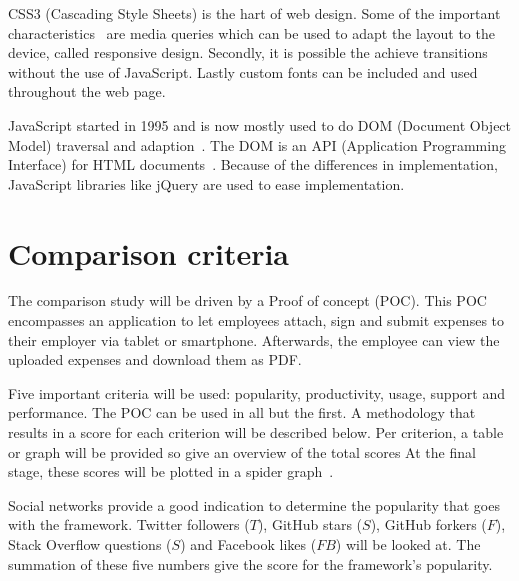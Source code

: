 \documentclass[a4paper]{artikel3}
\newcommand{\setspace}[0]{\vspace{2mm}}
\renewcommand{\paragraph}[1]{\setspace \noindent {\bf #1}  }
\begin{document}
CSS3 (Cascading Style Sheets) is the hart of web design.
Some of the important characteristics~\cite{MacDonald2011} are media queries which can be used to adapt the layout to the device, called responsive design.
Secondly, it is possible the achieve transitions without the use of JavaScript.
Lastly custom fonts can be included and used throughout the web page.

JavaScript started in 1995 and is now mostly used to do DOM (Document Object Model) traversal and adaption~\cite{PhilDutson2012}.
The DOM is an API (Application Programming Interface) for HTML documents~\cite{Hegaret2004}.
Because of the differences in implementation, JavaScript libraries like jQuery are used to ease implementation.


\section{Comparison criteria} %
\label{sec:comparisoncriteria}

The comparison study will be driven by a Proof of concept (POC).  
This POC encompasses an application to let employees attach, sign and submit expenses to their employer via tablet or smartphone.
Afterwards, the employee can view the uploaded expenses and download them as PDF.

Five important criteria will be used:  popularity,  productivity,  usage,  support and performance. 
The POC can be used in all but the first.   
A methodology that results in a score for each criterion will be described below.  
Per criterion,  a table or graph will be provided so give an overview of the total scores
At the final stage,  these scores will be plotted in a spider graph~\cite{Few2005}.   


\paragraph{Popularity}
Social networks provide a good indication to determine the popularity that goes with the framework.  
Twitter followers ($T$),  GitHub stars ($S$),  GitHub forkers ($F$),  Stack Overflow questions ($S$) and Facebook likes ($FB$) will be looked at.
The summation of these five numbers give the score for the framework's popularity.  
\end{document}
